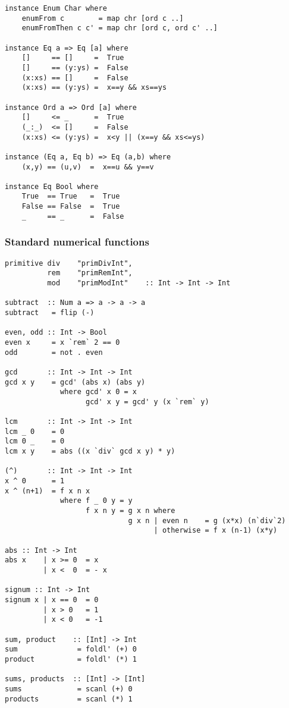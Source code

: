 \begin{verbatim}
instance Enum Char where
    enumFrom c        = map chr [ord c ..]
    enumFromThen c c' = map chr [ord c, ord c' ..]

instance Eq a => Eq [a] where
    []     == []     =  True
    []     == (y:ys) =  False
    (x:xs) == []     =  False
    (x:xs) == (y:ys) =  x==y && xs==ys

instance Ord a => Ord [a] where
    []     <= _      =  True
    (_:_)  <= []     =  False
    (x:xs) <= (y:ys) =  x<y || (x==y && xs<=ys)

instance (Eq a, Eq b) => Eq (a,b) where
    (x,y) == (u,v)  =  x==u && y==v

instance Eq Bool where
    True  == True   =  True
    False == False  =  True
    _     == _      =  False
\end{verbatim}
\subsubsection*{Standard numerical functions}
\begin{verbatim}
primitive div    "primDivInt",
          rem    "primRemInt",
          mod    "primModInt"    :: Int -> Int -> Int

subtract  :: Num a => a -> a -> a
subtract   = flip (-)

even, odd :: Int -> Bool
even x     = x `rem` 2 == 0
odd        = not . even

gcd       :: Int -> Int -> Int
gcd x y    = gcd' (abs x) (abs y)
             where gcd' x 0 = x
                   gcd' x y = gcd' y (x `rem` y)

lcm       :: Int -> Int -> Int
lcm _ 0    = 0
lcm 0 _    = 0
lcm x y    = abs ((x `div` gcd x y) * y)

(^)       :: Int -> Int -> Int
x ^ 0      = 1
x ^ (n+1)  = f x n x
             where f _ 0 y = y
                   f x n y = g x n where
                             g x n | even n    = g (x*x) (n`div`2)
                                   | otherwise = f x (n-1) (x*y)

abs :: Int -> Int
abs x    | x >= 0  = x
         | x <  0  = - x

signum :: Int -> Int
signum x | x == 0  = 0
         | x > 0   = 1
         | x < 0   = -1

sum, product    :: [Int] -> Int
sum              = foldl' (+) 0
product          = foldl' (*) 1

sums, products	:: [Int] -> [Int]
sums             = scanl (+) 0
products         = scanl (*) 1
\end{verbatim}
